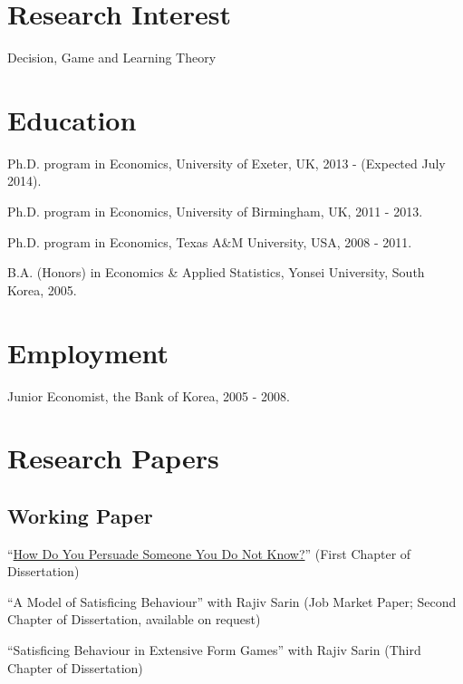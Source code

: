 \documentclass[letterpaper,11pt]{article}
\renewenvironment{itemize}{
\begin{list}{}{
\setlength{\leftmargin}{1.5em}
}
}{
\end{list}
}
\begin{document}
\section*{Research Interest}
\begin{itemize}
\item Decision, Game and Learning Theory
\end{itemize}


\section*{Education}
\begin{itemize}
\item Ph.D. program in Economics, University of Exeter, UK, 2013 - (Expected July 2014).

\item Ph.D. program in Economics, University of Birmingham, UK, 2011 - 2013.

\item Ph.D. program in Economics, Texas A\&M University, USA, 2008 - 2011.

\item B.A. (Honors) in Economics \& Applied Statistics, Yonsei University, South Korea, 2005.
\end{itemize}


\section*{Employment}

\begin{itemize}
\item Junior Economist, the Bank of Korea, 2005 - 2008.
\end{itemize}


\section*{Research Papers}
\subsection*{Working Paper}
\begin{itemize}
\item ``\href{http://works.bepress.com/yi/1}{\color{blue}How Do You Persuade Someone You Do Not Know?}'' (First Chapter of Dissertation)
\item ``A Model of Satisficing Behaviour'' with Rajiv Sarin (Job Market Paper; Second Chapter of Dissertation, available on request)
\item ``Satisficing Behaviour in Extensive Form Games'' with Rajiv Sarin (Third Chapter of Dissertation)
\end{itemize}
\end{document}
